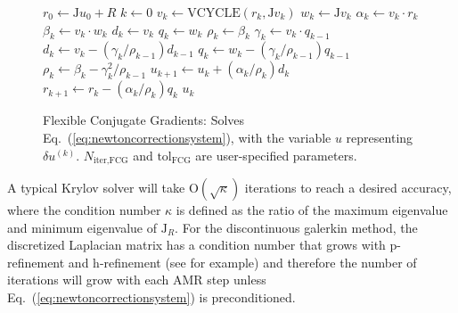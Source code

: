 \begin{figure}
  \begin{algorithm}[H]
    \caption{\label{alg:FCG}
    Flexible Conjugate Gradients: Solves Eq.~(\ref{eq:newtoncorrectionsystem}), with the variable $u$ representing $\delta u^{(k)}$. $N_{\text{iter,FCG}}$ and $\text{tol}_{\text{FCG}}$ are user-specified parameters.}%
    \begin{algorithmic}[1]
      \State $r_0 \leftarrow \mathrm{J}u_0 + R$
      \State $k \leftarrow 0$
      \State $v_k \leftarrow \text{VCYCLE}(r_k,\mathrm{J}v_k)$
      \State $w_k \leftarrow \mathrm{J}v_k$
      \State $\alpha_k \leftarrow v_k \cdot r_k$ 
      \State $\beta_k \leftarrow v_k \cdot w_k$
      \State $d_k \leftarrow v_k$
      \State $q_k \leftarrow w_k$
      \State $\rho_k \leftarrow \beta_k$
      \Else
      \State $\gamma_k \leftarrow v_k \cdot q_{k-1}$
      \State $d_k \leftarrow v_k - (\gamma_k/\rho_{k-1})d_{k-1}$
      \State $q_k \leftarrow w_k - (\gamma_k/\rho_{k-1})q_{k-1}$
      \State $\rho_k \leftarrow \beta_k - \gamma^2_k/\rho_{k-1}$
      \EndIf
      \State $u_{k+1} \leftarrow u_k + (\alpha_k/\rho_k)d_k$
      \State $r_{k+1} \leftarrow r_k - (\alpha_k/\rho_k)q_k$
      \EndWhile
      \State \Return $u_k$
      \EndFunction
    \end{algorithmic}
  \end{algorithm}
\end{figure}

A typical Krylov solver will take $\mathrm{O}(\sqrt{\kappa})$
iterations to reach a desired accuracy, where the condition number
$\kappa$ is defined as the ratio of the maximum eigenvalue and minimum
eigenvalue of $\mathrm{J}_R$. For the  discontinuous
galerkin method, the discretized Laplacian matrix has a condition
number that grows with p-refinement and h-refinement (see \cite{antonietti2011class,hesthaven2008nodal} for example) and therefore the number of iterations will grow with each AMR step unless Eq.~(\ref{eq:newtoncorrectionsystem}) is preconditioned.



